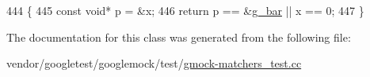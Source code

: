 \begin{DoxyCode}
444                                                      \{
445     \textcolor{keyword}{const} \textcolor{keywordtype}{void}* p = &x;
446     \textcolor{keywordflow}{return} p == &\hyperlink{namespacetesting_1_1gmock__matchers__test_a55dcc962203a3a3361d2e7e00ed99b4d}{g\_bar} || x == 0;
447   \}
\end{DoxyCode}


The documentation for this class was generated from the following file\+:\begin{DoxyCompactItemize}
\item 
vendor/googletest/googlemock/test/\hyperlink{gmock-matchers__test_8cc}{gmock-\/matchers\+\_\+test.\+cc}\end{DoxyCompactItemize}
